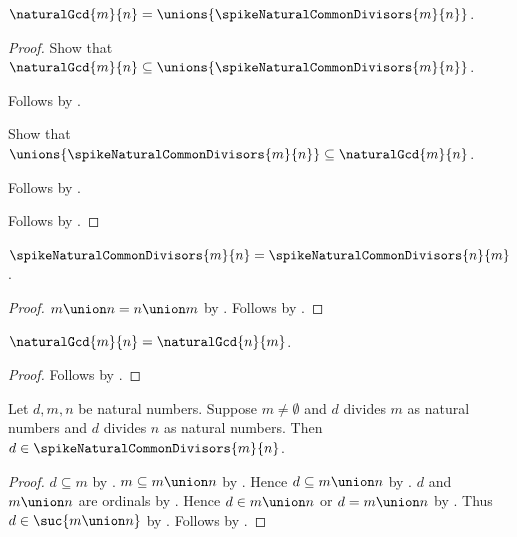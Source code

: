 \begin{proposition}\label{spike15_gcd_is_union_of_common_divisors}
    $\naturalGcd{m}{n}=
        \unions{\spikeNaturalCommonDivisors{m}{n}}$.
\end{proposition}
\begin{proof}
    Show that $\naturalGcd{m}{n}
        \subseteq\unions{\spikeNaturalCommonDivisors{m}{n}}$.
    \begin{subproof}
        Follows by
            .
    \end{subproof}
    Show that $\unions{\spikeNaturalCommonDivisors{m}{n}}
        \subseteq\naturalGcd{m}{n}$.
    \begin{subproof}
        Follows by
            .
    \end{subproof}
    Follows by .
\end{proof}

\begin{proposition}\label{spike15_common_divisors_symmetric}
    $\spikeNaturalCommonDivisors{m}{n}
        =\spikeNaturalCommonDivisors{n}{m}$.
\end{proposition}
\begin{proof}
    $m\union n=n\union m$ by .
    Follows by
        .
\end{proof}

\begin{proposition}\label{spike15_natural_gcd_symmetric}
    $\naturalGcd{m}{n}=\naturalGcd{n}{m}$.
\end{proposition}
\begin{proof}
    Follows by
        .
\end{proof}

\begin{proposition}\label{spike15_common_divisor_in_bounded_set}
    Let $d,m,n$ be natural numbers.
    Suppose $m\neq\emptyset$ and
        $d$ divides $m$ as natural numbers and
        $d$ divides $n$ as natural numbers.
    Then $d\in\spikeNaturalCommonDivisors{m}{n}$.
\end{proposition}
\begin{proof}
    $d\subseteq m$
        by .
    $m\subseteq m\union n$ by .
    Hence $d\subseteq m\union n$ by .
    $d$ and $m\union n$ are ordinals
        by .
    Hence $d\in m\union n$ or $d=m\union n$
        by .
    Thus $d\in\suc{m\union n}$ by .
    Follows by .
\end{proof}

